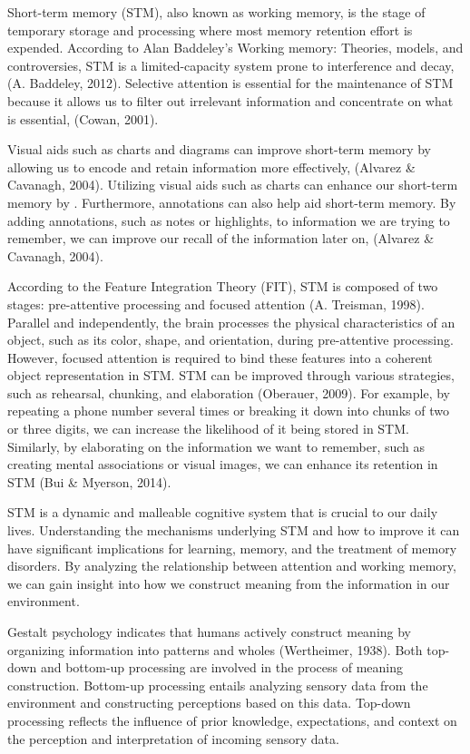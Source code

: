 \documentclass[print]{nuthesis}
\begin{document}
Short-term memory (STM), also known as working memory, is the stage of temporary storage and processing where most memory retention effort is expended.
According to Alan Baddeley's Working memory: Theories, models, and controversies, STM is a limited-capacity system prone to interference and decay, (A. Baddeley, 2012).
Selective attention is essential for the maintenance of STM because it allows us to filter out irrelevant information and concentrate on what is essential, (Cowan, 2001).

Visual aids such as charts and diagrams can improve short-term memory by allowing us to encode and retain information more effectively, (Alvarez \& Cavanagh, 2004).
Utilizing visual aids such as charts can enhance our short-term memory by .
Furthermore, annotations can also help aid short-term memory.
By adding annotations, such as notes or highlights, to information we are trying to remember, we can improve our recall of the information later on, (Alvarez \& Cavanagh, 2004).

According to the Feature Integration Theory (FIT), STM is composed of two stages: pre-attentive processing and focused attention (A. Treisman, 1998).
Parallel and independently, the brain processes the physical characteristics of an object, such as its color, shape, and orientation, during pre-attentive processing.
However, focused attention is required to bind these features into a coherent object representation in STM.
STM can be improved through various strategies, such as rehearsal, chunking, and elaboration (Oberauer, 2009).
For example, by repeating a phone number several times or breaking it down into chunks of two or three digits, we can increase the likelihood of it being stored in STM.
Similarly, by elaborating on the information we want to remember, such as creating mental associations or visual images, we can enhance its retention in STM (Bui \& Myerson, 2014).

STM is a dynamic and malleable cognitive system that is crucial to our daily lives.
Understanding the mechanisms underlying STM and how to improve it can have significant implications for learning, memory, and the treatment of memory disorders.
By analyzing the relationship between attention and working memory, we can gain insight into how we construct meaning from the information in our environment.

Gestalt psychology indicates that humans actively construct meaning by organizing information into patterns and wholes (Wertheimer, 1938).
Both top-down and bottom-up processing are involved in the process of meaning construction.
Bottom-up processing entails analyzing sensory data from the environment and constructing perceptions based on this data.
Top-down processing reflects the influence of prior knowledge, expectations, and context on the perception and interpretation of incoming sensory data.
\end{document}
